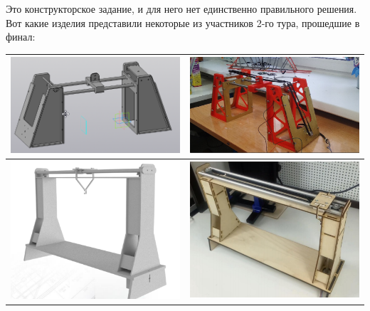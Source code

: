 \solutionSection

Это конструкторское задание, и для него нет единственно правильного решения. Вот какие изделия представили некоторые из участников 2-го тура, прошедшие в финал:

\begin{longtable}{|p{7cm}|p{7cm}|}
    \hline
    \includegraphics[width=7cm]{2} & \includegraphics[width=7cm]{3} \\
    \hline
    \includegraphics[width=7cm]{4} & \includegraphics[width=7cm]{5} \\
    \hline

\end{longtable}
